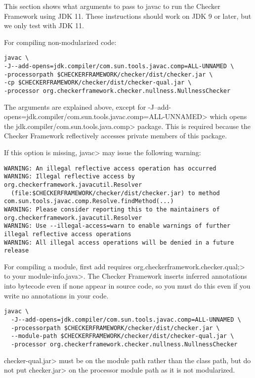
This section shows what arguments to pass to javac to run the Checker Framework using JDK 11.  These
instructions should work on JDK 9 or later, but we only test with JDK 11.

For compiling non-modularized code:
\begin{Verbatim}
javac \
-J--add-opens=jdk.compiler/com.sun.tools.javac.comp=ALL-UNNAMED \
-processorpath $CHECKERFRAMEWORK/checker/dist/checker.jar \
-cp $CHECKERFRAMEWORK/checker/dist/checker-qual.jar \
-processor org.checkerframework.checker.nullness.NullnessChecker
\end{Verbatim}

The arguments are explained above, except for
\<-J--add-opens=jdk.compiler/com.sun.tools.javac.comp=ALL-UNNAMED> which
opens the \<jdk.compiler/com.sun.tools.java.comp> package.  This is
required because the Checker Framework reflectively accesses private members of this package.

If this option is missing, \<javac> may issue the following warning:
\begin{Verbatim}
WARNING: An illegal reflective access operation has occurred
WARNING: Illegal reflective access by org.checkerframework.javacutil.Resolver
  (file:$CHECKERFRAMEWORK/checker/dist/checker.jar) to method com.sun.tools.javac.comp.Resolve.findMethod(...)
WARNING: Please consider reporting this to the maintainers of org.checkerframework.javacutil.Resolver
WARNING: Use --illegal-access=warn to enable warnings of further illegal reflective access operations
WARNING: All illegal access operations will be denied in a future release
\end{Verbatim}

For compiling a module, first add \<requires
org.checkerframework.checker.qual;> to your \<module-info.java>.  The Checker
Framework inserts inferred annotations into bytecode even if none appear in source code,
so you must do this even if you write no annotations in your code.

\begin{Verbatim}
javac \
  -J--add-opens=jdk.compiler/com.sun.tools.javac.comp=ALL-UNNAMED \
  -processorpath $CHECKERFRAMEWORK/checker/dist/checker.jar \
  --module-path $CHECKERFRAMEWORK/checker/dist/checker-qual.jar \
  -processor org.checkerframework.checker.nullness.NullnessChecker
\end{Verbatim}

\<checker-qual.jar> must be on the module path rather than the class path, but
do not put \<checker.jar> on the processor module path as it is not
modularized.


